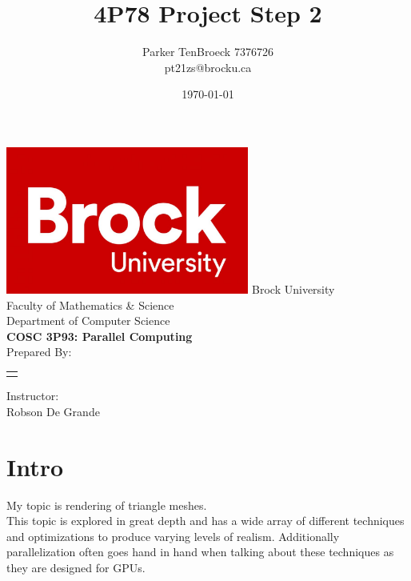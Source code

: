 \documentclass[12pt]{article}
\begin{document}
\title{4P78 Project Step 2}
\author{
    Parker TenBroeck 7376726\\
    pt21zs@brocku.ca
}
\date{\today}

\makeatletter
\begin{titlepage}
	\def \LOGOPATH {brock.jpg}
	\def \UNIVERSITY {Brock University}
	\def \FACULTY {Faculty of Mathematics \& Science}
	\def \DEPARTMENT {Department of Computer Science}
	\def \COURSETITLE {COSC 3P93: Parallel Computing}
	\def \SUPERVISOR {Robson De Grande}
	
	
	\vfill
	\begin{center}
		\includegraphics[width=0.6\textwidth]{brock.jpg}
		\fontsize{14pt}{14pt}\selectfont
		\vfill
		\UNIVERSITY \\
		\FACULTY \\
		\DEPARTMENT \\
		\vfill
		\fontsize{18pt}{18pt}\selectfont
		\textbf{\COURSETITLE} \\[0.5cm]
		\textbf{\@title}
		\vfill
		\fontsize{14pt}{14pt}\selectfont
		Prepared By: \\[0.5cm]
		
		\begin{tabular}[t]{c}
			\@author
		\end{tabular}\par
	
	    \vfill
		Instructor: \\
		\SUPERVISOR
		\vfill
		\@date
	\end{center}
\end{titlepage}
\makeatother

\newpage

\section{Intro}
My topic is rendering of triangle meshes. \\

This topic is explored in great depth and has a wide array of different techniques and optimizations to produce varying levels of realism. Additionally parallelization often goes hand in hand when talking about these techniques as they are designed for GPUs. \\
\end{document}
